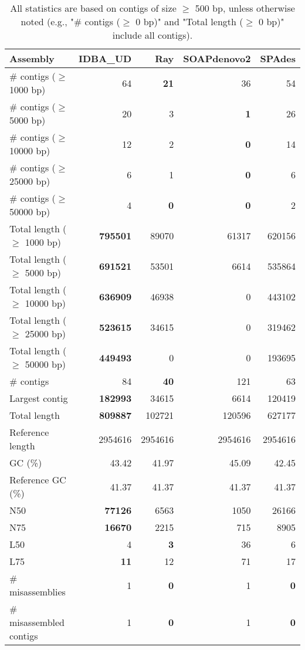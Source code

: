 \documentclass[12pt,a4paper]{article}
\begin{document}
\begin{table}[ht]
\begin{center}
\caption{All statistics are based on contigs of size $\geq$ 500 bp, unless otherwise noted (e.g., "\# contigs ($\geq$ 0 bp)" and "Total length ($\geq$ 0 bp)" include all contigs).}
\begin{tabular}{|l*{4}{|r}|}
\hline
Assembly & IDBA\_UD & Ray & SOAPdenovo2 & SPAdes \\ \hline
\# contigs ($\geq$ 1000 bp) & 64 & {\bf 21} & 36 & 54 \\ \hline
\# contigs ($\geq$ 5000 bp) & 20 & 3 & {\bf 1} & 26 \\ \hline
\# contigs ($\geq$ 10000 bp) & 12 & 2 & {\bf 0} & 14 \\ \hline
\# contigs ($\geq$ 25000 bp) & 6 & 1 & {\bf 0} & 6 \\ \hline
\# contigs ($\geq$ 50000 bp) & 4 & {\bf 0} & {\bf 0} & 2 \\ \hline
Total length ($\geq$ 1000 bp) & {\bf 795501} & 89070 & 61317 & 620156 \\ \hline
Total length ($\geq$ 5000 bp) & {\bf 691521} & 53501 & 6614 & 535864 \\ \hline
Total length ($\geq$ 10000 bp) & {\bf 636909} & 46938 & 0 & 443102 \\ \hline
Total length ($\geq$ 25000 bp) & {\bf 523615} & 34615 & 0 & 319462 \\ \hline
Total length ($\geq$ 50000 bp) & {\bf 449493} & 0 & 0 & 193695 \\ \hline
\# contigs & 84 & {\bf 40} & 121 & 63 \\ \hline
Largest contig & {\bf 182993} & 34615 & 6614 & 120419 \\ \hline
Total length & {\bf 809887} & 102721 & 120596 & 627177 \\ \hline
Reference length & 2954616 & 2954616 & 2954616 & 2954616 \\ \hline
GC (\%) & 43.42 & 41.97 & 45.09 & 42.45 \\ \hline
Reference GC (\%) & 41.37 & 41.37 & 41.37 & 41.37 \\ \hline
N50 & {\bf 77126} & 6563 & 1050 & 26166 \\ \hline
N75 & {\bf 16670} & 2215 & 715 & 8905 \\ \hline
L50 & 4 & {\bf 3} & 36 & 6 \\ \hline
L75 & {\bf 11} & 12 & 71 & 17 \\ \hline
\# misassemblies & 1 & {\bf 0} & 1 & {\bf 0} \\ \hline
\# misassembled contigs & 1 & {\bf 0} & 1 & {\bf 0} \\ \hline

\end{tabular}
\end{center}
\end{table}
\end{document}
